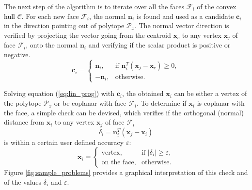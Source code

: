 The next step of the algorithm is to iterate over all the faces $\mathcal{F}_i$ of the convex hull $\mathcal{C}$. For each new face $\mathcal{F}_i$, the normal $\bm{n}_i$ is found and used as a candidate $\bm{c}_i$ in the direction pointing out of polytope $\mathcal{P}_x$.
The normal vector direction is verified by projecting the vector going from the centroid $\bm{x}_c$ to any vertex $\bm{x}_{j}$ of face $\mathcal{F}_i$, onto the normal $\bm{n}_i$ and verifying if the scalar product is positive or negative.
\begin{equation}
    \bm{c}_i = \begin{cases}
  \bm{n}_i, & \text{if } \bm{n}_i^T(\bm{x}_{j} - \bm{x}_c) \geq 0, \\
  -\bm{n}_i, & \text{otherwise}.
\end{cases} 
\label{eq:normal_condition}
\end{equation}


Solving equation (\ref{eq:lin_prog}) with $\bm{c}_i$, the obtained $\bm{x}_i$ can be either a vertex of the polytope $\mathcal{P}_x$ or be coplanar with face $\mathcal{F}_i$. To determine if  $\bm{x}_i$ is coplanar with the face, a simple check can be devised, which verifies if the orthogonal (normal) distance from $\bm{x}_i$ to any vertex $\bm{x}_{j}$ of face $\mathcal{F}_i$
\begin{equation}
    \delta_i = \bm{n}_i^T(\bm{x}_{j} - \bm{x}_i)
\label{eq:normal_distance}
\end{equation}
is within a certain user defined accuracy $\varepsilon$:
\begin{equation}
    \bm{x}_i = \begin{cases}
   \text{vertex}, & \text{if }  |\delta_i| \geq \varepsilon, \\
    \text{on the face}, & \text{otherwise}.
\end{cases} 
\label{eq:normal_coplanar_test}
\end{equation}
Figure \ref{fig:sample_problems} provides a graphical interpretation of this check and of the values $\delta_i$ and $\varepsilon$.

